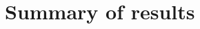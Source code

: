\documentclass[thesis=M,english]{FITthesis}[2012/10/20]
\begin{document}




	
\section{Summary of results}
\end{document}
